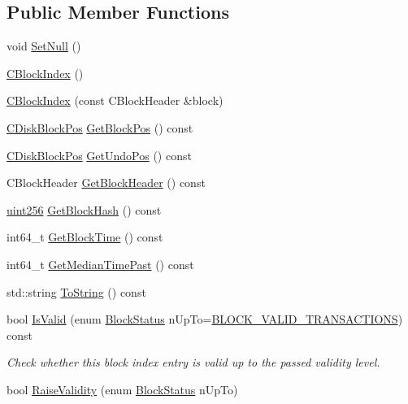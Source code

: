 \subsection*{Public Member Functions}
\begin{DoxyCompactItemize}
\item 
void \hyperlink{class_c_block_index_a6139e9e2cfceaef3694631cb7c330ff0}{Set\+Null} ()
\item 
\hyperlink{class_c_block_index_a0eff34cbfb4470885020734581dc1555}{C\+Block\+Index} ()
\item 
\hyperlink{class_c_block_index_acaf83989071b40966072161c513a17a7}{C\+Block\+Index} (const C\+Block\+Header \&block)
\item 
\hyperlink{struct_c_disk_block_pos}{C\+Disk\+Block\+Pos} \hyperlink{class_c_block_index_ae2b58426ae9365dce6cfacc5d0c92e44}{Get\+Block\+Pos} () const 
\item 
\hyperlink{struct_c_disk_block_pos}{C\+Disk\+Block\+Pos} \hyperlink{class_c_block_index_a62654ef291abc44d2e32db9a8d85b7d1}{Get\+Undo\+Pos} () const 
\item 
C\+Block\+Header \hyperlink{class_c_block_index_a8292a7bf7e79e207306a8659bf7da3a6}{Get\+Block\+Header} () const 
\item 
\hyperlink{classuint256}{uint256} \hyperlink{class_c_block_index_ab843ef9b8b0a0193ec3a5c24738e484f}{Get\+Block\+Hash} () const 
\item 
int64\+\_\+t \hyperlink{class_c_block_index_ab63b774ae798f5f9e54b400ac8b5ef4b}{Get\+Block\+Time} () const 
\item 
int64\+\_\+t \hyperlink{class_c_block_index_abffb24cc73329a3dce024403ba770b4a}{Get\+Median\+Time\+Past} () const 
\item 
std\+::string \hyperlink{class_c_block_index_abed1fcbcd372db6b9efa6bb9da317469}{To\+String} () const 
\item 
bool \hyperlink{class_c_block_index_ab79ac7f3db34001898a371ecce27808f}{Is\+Valid} (enum \hyperlink{chain_8h_a43adb063ba9e8b0f1143146d9c7929d9}{Block\+Status} n\+Up\+To=\hyperlink{chain_8h_a43adb063ba9e8b0f1143146d9c7929d9a3eef30f876594ac79b888b7d1ff6c66c}{B\+L\+O\+C\+K\+\_\+\+V\+A\+L\+I\+D\+\_\+\+T\+R\+A\+N\+S\+A\+C\+T\+I\+O\+N\+S}) const 
\begin{DoxyCompactList}\small\item\em Check whether this block index entry is valid up to the passed validity level. \end{DoxyCompactList}\item 
bool \hyperlink{class_c_block_index_a076aff906933e9d75a37aa9b81c01384}{Raise\+Validity} (enum \hyperlink{chain_8h_a43adb063ba9e8b0f1143146d9c7929d9}{Block\+Status} n\+Up\+To)

\end{DoxyCompactItemize}
